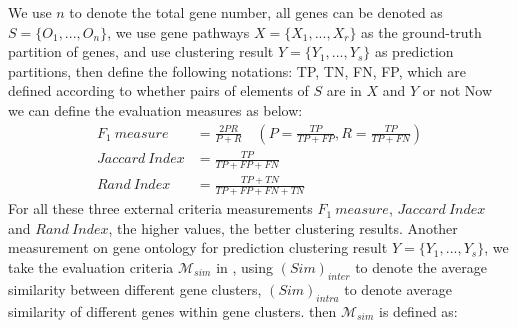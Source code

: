 \documentclass{bmcart}
\begin{document}
 We use $n$ to denote the total gene number, all genes can be denoted as $S=\{O_1,...,O_n\}$, we use gene pathways $X=\{X_1,...,X_r\}$ as the ground-truth partition of genes, and use clustering result $Y=\{Y_1,...,Y_s\}$ as prediction partitions, then define the following notations: TP, TN, FN, FP, which are defined according to whether pairs of elements of $S$ are in $X$ and $Y$ or not
Now we can define the evaluation measures as below:
\begin{equation}\label{}\nonumber
\begin{split}
F_{1}\ measure&=\frac{2PR}{P+R}\quad(P=\frac{TP}{TP+FP},  R=\frac{TP}{TP+FN}) \\
Jaccard\ Index&=\frac{TP}{TP+FP+FN}\\
Rand\ Index&=\frac{TP+TN}{TP+FP+FN+TN}
\end{split}
\end{equation}
For all these three external criteria measurements $F_1\ measure$, $Jaccard\ Index$ and $Rand\ Index$, the higher values, the better clustering results.
Another measurement on gene ontology for prediction clustering result $Y=\{Y_1,...,Y_s\}$, we take the evaluation criteria $\mathcal{M}_{sim}$ in \cite{Bordino2010}, using  $(Sim)_{inter}$ to denote the average similarity between different gene clusters, $(Sim)_{intra}$ to denote average similarity of different genes within gene clusters. then $\mathcal{M}_{sim}$ is defined as:
\end{document}
